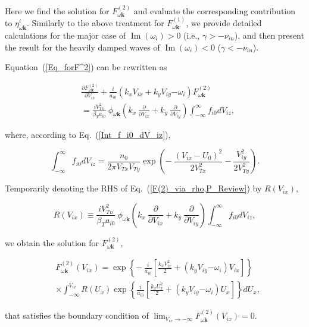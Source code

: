\documentclass[draft]{agujournal2019}
\renewcommand{\vec}{\mathbf}
\begin{document}
{Here we find the solution for $F_{\omega\vec{k}}^{(2)}$ and evaluate the
corresponding contribution to $\eta_{\omega\vec{k}}^{i}$. Similarly to the 
above treatment for $F_{\omega\vec{k}}^{(1)}$, we provide detailed calculations 
for the major case of $\operatorname{Im}(\omega_i)>0$ (i.e., $\gamma>-\nu_{in}$), and then present the 
result for the heavily damped waves of $\operatorname{Im}(\omega_i)<0$ ($\gamma<-\nu_{in}$).

Equation~(\ref{Eq_forF^2}) can be rewritten as
\begin{linenomath*}
\begin{align}
&  \frac{\partial F_{\omega\vec{k}}^{(2)}}{\partial V_{ix}}+\frac{i}{a_{i0}%
}(k_{x}V_{ix}+k_{y}V_{iy}\mathbf{-}\omega_{i})F_{\omega\vec{k}}^{(2)}\nonumber\\
&  =\frac{iV_{Tn}^{2}}{\beta_{T}a_{i0}}\ \phi_{\omega\vec{k}}\left(
k_{x}\ \frac{\partial}{\partial V_{ix}}+k_{y}\ \frac{\partial}{\partial
V_{iy}}\right)  \int_{-\infty}^{\infty}f_{i0}dV_{iz},
\label{F(2)_via_rho,P_Review}
\end{align}
\end{linenomath*}
where, according to Eq.~(\ref{Int_f_i0_dV_iz}),
\begin{linenomath*}
\begin{equation}
\int_{-\infty}^{\infty}f_{i0}dV_{iz}=\frac{n_{0}}{2\pi V_{Tx}V_{Ty}}
\exp\left(  -~\frac{(V_{ix}-U_{0})^{2}}{2V_{Tx}^{2}}-\frac{V_{iy}%
^{2}}{2V_{Ty}^{2}}\right)  . 
\label{Int_dz_BGK}
\end{equation}
\end{linenomath*}
Temporarily denoting the RHS of Eq.~(\ref{F(2)_via_rho,P_Review}) by
$R(V_{ix})$,
\begin{linenomath*}
\[
R(V_{ix})\equiv\frac{iV_{Tn}^{2}}{\beta_{T}a_{i0}}\ \phi_{\omega\vec{k}%
}\left(  k_{x}\ \frac{\partial}{\partial V_{ix}}+k_{y}\ \frac{\partial
}{\partial V_{iy}}\right)  \int_{-\infty}^{\infty}f_{i0}dV_{iz},
\]
\end{linenomath*}
we obtain the solution for $F_{\omega\vec{k}}^{(2)}$,
\begin{linenomath*}
\begin{align*}
&  F_{\omega\vec{k}}^{(2)}(V_{ix})=\exp\left\{  -\ \frac{i}{a_{i0}}\left[
\frac{k_{x}V_{ix}^{2}}{2}+(k_{y}V_{iy}\mathbf{-}\omega_{i})V_{ix}\right]
\right\} \\
&  \times\int_{-\infty}^{V_{ix}}R(U_{x})\exp\left\{  \frac{i}{a_{i0}}\left[
\frac{k_{x}U_{x}^{2}}{2}+(k_{y}V_{iy}\mathbf{-}\omega_{i})U_{x}\right]
\right\}  dU_{x},
\end{align*}
\end{linenomath*}
that satisfies the boundary condition of $\lim_{V_{ix}\rightarrow-\infty}F_{\omega\vec{k}}^{(2)}(V_{ix})=0$.

}
\end{document}
